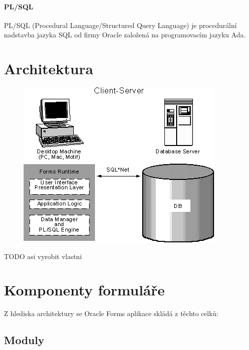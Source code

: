 \documentclass{bakalarka}
\begin{document}
\paragraph{PL/SQL}
PL/SQL (Procedural Language/Structured Query Language) je procedurální nadstavba jazyka SQL od firmy Oracle založená na programovacím jazyku Ada.

\section{Architektura}

\begin{figure}[H]
  \centering
  \includegraphics[scale=0.8]{obr/d2k_wea2.png}
  \label{}
\end{figure}
TODO asi vyrobit vlastni

\section{Komponenty formuláře}
Z hlediska architektury se Oracle Forms aplikace skládá z těchto celků:

\subsection{Moduly}
\end{document}
